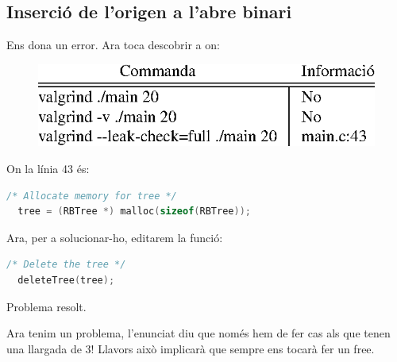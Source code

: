 \subsection{Inserció de l'origen a l'abre binari}
Ens dona un error. Ara toca descobrir a on:
\begin{figure}[h]
\centering
\includegraphics{1Entrega/tblAbre.eps}
\end{figure}

On la línia 43 és:

\begin{lstlisting}[language=C]
  /* Allocate memory for tree */
  tree = (RBTree *) malloc(sizeof(RBTree));
\end{lstlisting}

Ara, per a solucionar-ho, editarem la funció:
\begin{lstlisting}[language=C]
  /* Delete the tree */
  deleteTree(tree);
\end{lstlisting}

Problema resolt.


Ara tenim un problema, l'enunciat diu que només hem de fer cas als que tenen una llargada de 3!
Llavors això implicarà que sempre ens tocarà fer un free.
